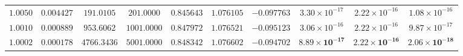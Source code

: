 \documentclass[11pt,a4paper]{article}
\theoremstyle{definition}
\theoremstyle{remark}
\begin{document}
\begin{table}[H]
{\begin{tabular}{@{} c c c c c c c c c c @{}}
    $1.0050$  & $0.004427$ & $191.0105$  & $201.0000$  & $0.845643$ & $1.076105$ & $-0.097763$ & $3.30 \times 10^{-17}$ & $2.22 \times 10^{-16}$ & $1.08 \times 10^{-16}$ \\
    $1.0010$  & $0.000889$ & $953.6062$  & $1001.0000$ & $0.847972$ & $1.076521$ & $-0.095123$ & $3.06 \times 10^{-16}$ & $2.22 \times 10^{-16}$ & $9.87 \times 10^{-17}$ \\
    $\mathbf{1.0002}$ & $\mathbf{0.000178}$ & $\mathbf{4766.3436}$ & $\mathbf{5001.0000}$ & $\mathbf{0.848342}$ & $\mathbf{1.076602}$ & $\mathbf{-0.094702}$ & $\mathbf{8.89 \times 10^{-17}}$ & $\mathbf{2.22 \times 10^{-16}}$ & $\mathbf{2.06 \times 10^{-18}}$ \\
    \bottomrule
  \end{tabular}%
  }
\end{table}
\end{document}
